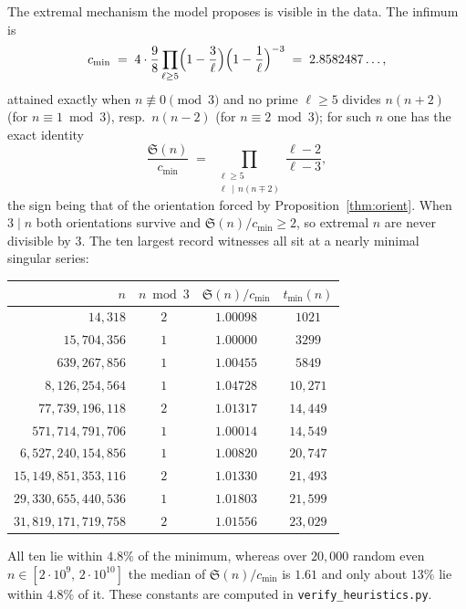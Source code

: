 \documentclass[10pt]{article}
\theoremstyle{definition}
\theoremstyle{remark}
\begin{document}
The extremal mechanism the model proposes is visible in the data. The infimum
is
\[
c_{\min} \;=\; 4 \cdot \frac{9}{8}
\prod_{\ell \ge 5}\Bigl(1 - \frac{3}{\ell}\Bigr)
\Bigl(1 - \frac{1}{\ell}\Bigr)^{-3}
\;=\; 2.8582487\ldots,
\]
attained exactly when $n \not\equiv 0 \pmod 3$ and no prime $\ell \ge 5$
divides $n(n+2)$ (for $n \equiv 1 \bmod 3$), resp.\ $n(n-2)$ (for
$n \equiv 2 \bmod 3$); for such $n$ one has the exact identity
\[
\frac{\mathfrak{S}(n)}{c_{\min}}
\;=\; \prod_{\substack{\ell \ge 5 \\ \ell \,\mid\, n(n \mp 2)}}
\frac{\ell - 2}{\ell - 3},
\]
the sign being that of the orientation forced by
Proposition~\ref{thm:orient}. When $3 \mid n$ both orientations survive and
$\mathfrak{S}(n)/c_{\min} \ge 2$, so extremal $n$ are never divisible by
$3$. The ten largest record witnesses all sit at a nearly minimal singular
series:

\begin{center}
\begin{tabular}{rccc}
\toprule
$n$ & $n \bmod 3$ & $\mathfrak{S}(n)/c_{\min}$ & $t_{\min}(n)$ \\
\midrule
$14{,}318$          & $2$ & $1.00098$ & $1021$ \\
$15{,}704{,}356$    & $1$ & $1.00000$ & $3299$ \\
$639{,}267{,}856$   & $1$ & $1.00455$ & $5849$ \\
$8{,}126{,}254{,}564$  & $1$ & $1.04728$ & $10{,}271$ \\
$77{,}739{,}196{,}118$ & $2$ & $1.01317$ & $14{,}449$ \\
$571{,}714{,}791{,}706$ & $1$ & $1.00014$ & $14{,}549$ \\
$6{,}527{,}240{,}154{,}856$ & $1$ & $1.00820$ & $20{,}747$ \\
$15{,}149{,}851{,}353{,}116$ & $2$ & $1.01330$ & $21{,}493$ \\
$29{,}330{,}655{,}440{,}536$ & $1$ & $1.01803$ & $21{,}599$ \\
$31{,}819{,}171{,}719{,}758$ & $2$ & $1.01556$ & $23{,}029$ \\
\bottomrule
\end{tabular}
\end{center}

All ten lie within $4.8\%$ of the minimum, whereas over $20{,}000$ random even
$n \in [2\cdot 10^9,\, 2 \cdot 10^{10}]$ the median of
$\mathfrak{S}(n)/c_{\min}$ is $1.61$ and only about $13\%$ lie within $4.8\%$
of it. These constants are computed in \texttt{verify\_heuristics.py}.
\end{document}
